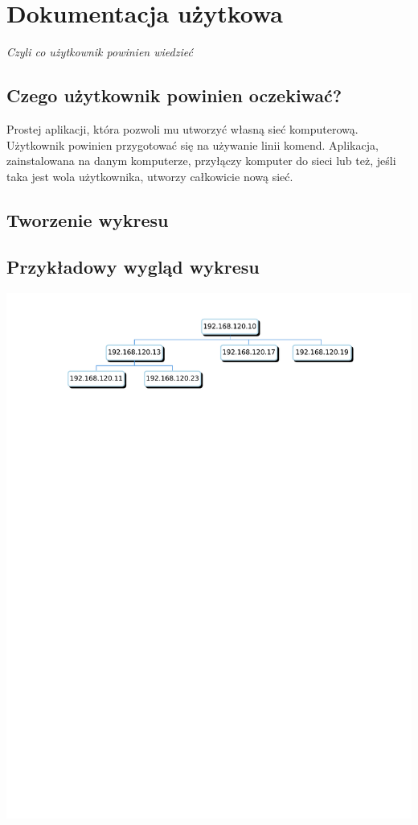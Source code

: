 \section{Dokumentacja użytkowa}

\begin{center}
\textit{Czyli co użytkownik powinien wiedzieć}
\end{center}



\subsection{Czego użytkownik powinien oczekiwać?}
Prostej aplikacji, która pozwoli mu utworzyć własną sieć komputerową. Użytkownik powinien przygotować się na używanie linii komend.
Aplikacja, zainstalowana na danym komputerze, przyłączy komputer do sieci lub też, jeśli taka jest wola użytkownika, utworzy całkowicie nową sieć.

\subsection{Tworzenie wykresu}


\subsection{Przykładowy wygląd wykresu}

\includegraphics[width=1.0\textwidth]{chart.jpg}

